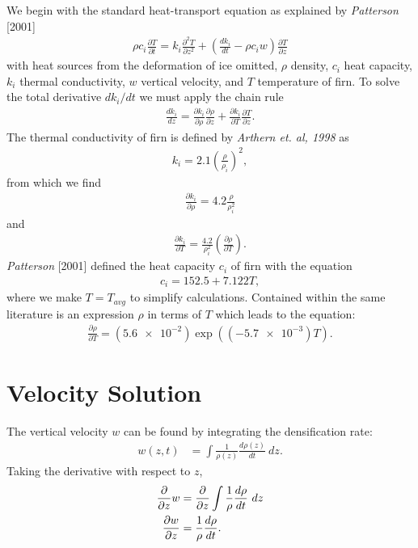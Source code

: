 \documentclass{article}%
\begin{document}
We begin with the standard heat-transport equation as explained by \emph{Patterson} [2001]
\begin{align}
  \rho c_i \frac{\partial T}{\partial t} = 
    k_i \frac{\partial^2 T}{\partial z^2} +
    \left( \frac{dk_i}{dt} - \rho c_i w \right) \frac{\partial T}{\partial z}
\end{align}
with heat sources from the deformation of ice omitted, $\rho$ density, $c_i$ heat capacity, $k_i$ thermal conductivity, $w$ vertical velocity, and $T$ temperature of firn.  To solve the total derivative $dk_i/dt$ we must apply the chain rule
\begin{align*}
  \frac{dk_i}{dz} = 
  \frac{\partial k_i}{\partial \rho} \frac{\partial \rho}{\partial z} + 
  \frac{\partial k_i}{\partial T} \frac{\partial T}{\partial z}.
\end{align*}
The thermal conductivity of firn is defined by \emph{Arthern et. al, 1998} as
\begin{align*}
  k_i = 2.1 \left(\frac{\rho}{\rho_i}\right)^2,
\end{align*}
from which we find
\begin{align*}
  \frac{\partial k_i}{\partial \rho} = 
    4.2 \frac{\rho}{\rho_i^2}
\end{align*}
and
\begin{align*}
  \frac{\partial k_i}{\partial T} = 
    \frac{4.2}{\rho_i^2} \left( \frac{\partial \rho}{\partial T} \right).
\end{align*}
\emph{Patterson} [2001] defined the heat capacity $c_i$ of firn with the equation
\begin{align*}
  c_i = 152.5 + 7.122 T,
\end{align*}
where we make $T=T_{avg}$ to simplify calculations.  Contained within the same literature is an expression $\rho$ in terms of $T$ which leads to the equation:
\begin{align}
  \frac{\partial \rho}{\partial T} = 
    (\SI{5.6e-2}) \exp ((\SI{-5.7e-3})T).
\end{align}



\section{Velocity Solution}

The vertical velocity $w$ can be found by integrating the densification rate:
\begin{align*}
  w(z,t) &= \int \frac{1}{\rho(z)} \frac{d\rho(z)}{dt}\ dz.
\end{align*}
Taking the derivative with respect to $z$,
\begin{align}
  \frac{\partial}{\partial z} w &= \frac{\partial}{\partial z} \int \frac{1}{\rho} \frac{d\rho}{dt}\ dz \notag \\
  \frac{\partial w}{\partial z} &= \frac{1}{\rho} \frac{d\rho}{dt}.
\end{align}
\end{document}
